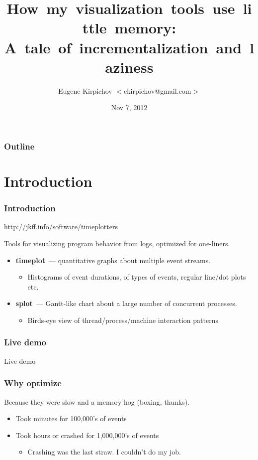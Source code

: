 \documentclass{beamer}
\title{\mbox{How my visualization tools use little memory:}\\
\mbox{A tale of incrementalization and laziness}}
\author[Eugene Kirpichov]{Eugene Kirpichov $<$ekirpichov@gmail.com$>$}
\date{Nov 7, 2012}
\institute[SPb fprog]{St.-Petersburg Functional Programming User Group}
\begin{document}
\begin{frame}
\titlepage
\end{frame}

\begin{frame}
\frametitle{Outline}
\tableofcontents
\end{frame}

\section{Introduction}

\begin{frame}
  \frametitle{Introduction}
  \url{http://jkff.info/software/timeplotters}

  Tools for visualizing program behavior from logs, optimized for one-liners.

  \begin{itemize}
    \item \textbf{timeplot}~--- quantitative graphs about multiple event streams.
    \begin{itemize}
      \item Histograms of event durations, of types of events, regular line/dot plots etc.
    \end{itemize}
    \item \textbf{splot}~--- Gantt-like chart about a large number of concurrent processes.
    \begin{itemize}
      \item Birds-eye view of thread/process/machine interaction patterns
    \end{itemize}
  \end{itemize}
\end{frame}

\begin{frame}
  \frametitle{Live demo}

  \begin{center}
  Live demo
  \end{center}
\end{frame}

\begin{frame}
  \frametitle{Why optimize}
  Because they were slow and a memory hog (boxing, thunks).
  \begin{itemize}
    \item Took minutes for 100,000's of events
    \item Took hours or crashed for 1,000,000's of events
    \begin{itemize}
    \item Crashing was the last straw. I couldn't do my job.
    \end{itemize}
  \end{itemize}
\end{frame}
\end{document}
